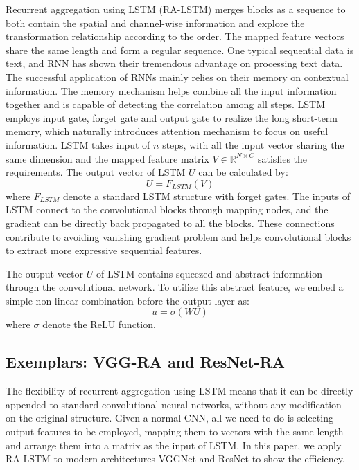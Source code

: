 \documentclass[runningheads]{llncs}
\begin{document}
Recurrent aggregation using LSTM (RA-LSTM) merges blocks as a sequence to both contain the spatial and channel-wise information and explore the transformation relationship according to the order. The mapped feature vectors share the same length and form a regular sequence. One typical sequential data is text, and RNN has shown their tremendous advantage on processing text data. The successful application of RNNs mainly relies on their memory on contextual information. The memory mechanism helps combine all the input information together and is capable of detecting the correlation among all steps. LSTM employs input gate, forget gate and output gate to realize the long short-term memory, which naturally introduces attention mechanism to focus on useful information. LSTM takes input of $n$ steps, with all the input vector sharing the same dimension and the mapped feature matrix $V\in \mathbb{R}^{N\times C}$ satisfies the requirements. The output vector of LSTM $U$ can be calculated by:
\begin{equation}
U = F_{LSTM}(V)
\end{equation}
where $F_{LSTM}$ denote a standard LSTM structure with forget gates. The inputs of LSTM connect to the convolutional blocks through mapping nodes, and the gradient can be directly back propagated to all the blocks. These connections contribute to avoiding vanishing gradient problem and helps convolutional blocks to extract more expressive sequential features.

The output vector $U$ of LSTM contains squeezed and abstract information through the convolutional network. To utilize this abstract feature, we embed a simple non-linear combination before the output layer as:
\begin{equation}
u = \sigma(WU)
\end{equation}
where $\sigma$ denote the ReLU\cite{ReLU} function. 

\subsection{Exemplars: VGG-RA and ResNet-RA}
The flexibility of recurrent aggregation using LSTM means that it can be directly appended to standard convolutional neural networks, without any modification on the original structure. Given a normal CNN, all we need to do is selecting output features to be employed, mapping them to vectors with the same length and arrange them into a matrix as the input of LSTM. In this paper, we apply RA-LSTM to modern architectures VGGNet and ResNet to show the efficiency.
\end{document}
